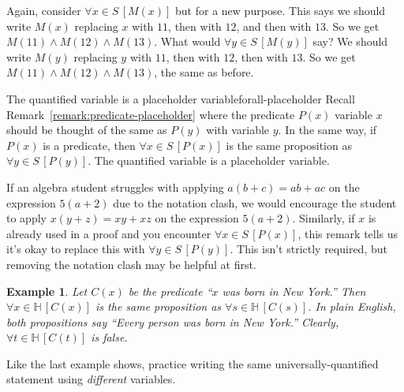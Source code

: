 \documentclass{book}
\newcounter{ekcounter}%
\theoremstyle{ekimcustom}
\newtheorem{example}[ekcounter]{Example}
\begin{document}
Again, consider $\forall x \in S\,[M(x)]$ but for a new purpose. This says we should write $M(x)$ replacing $x$ with $11$, then with $12$, and then with $13$. So we get $M(11) \wedge M(12) \wedge M(13)$. What would $\forall y \in S\,[M(y)]$ say? We should write $M(y)$ replacing $y$ with $11$, then with $12$, then with $13$. So we get $M(11) \wedge M(12) \wedge M(13)$, the same as before.
\begin{bremark}{The quantified variable is a placeholder variable}{forall-placeholder}
Recall Remark~\ref{remark:predicate-placeholder} where the predicate $P(x)$ variable $x$ should be thought of the same as $P(y)$ with variable $y$. In the same way, if $P(x)$ is a predicate, then $\forall x \in S\,[P(x)]$ is the same proposition as $\forall y \in S\,[P(y)]$. The quantified variable is a placeholder variable.
\end{bremark}
If an algebra student struggles with applying $a(b+c)=ab+ac$ on the expression $5(a+2)$ due to the notation clash, we would encourage the student to apply $x(y+z)=xy+xz$ on the expression $5(a+2)$. Similarly, if $x$ is already used in a proof and you encounter $\forall x \in S\,[P(x)]$, this remark tells us it's okay to replace this with $\forall y \in S\,[P(y)]$. This isn't strictly required, but removing the notation clash may be helpful at first.
\begin{example}
Let $C(x)$ be the predicate ``$x$ was born in New York.'' Then $\forall x \in \mathbb{H}\,[C(x)]$ is the same proposition as $\forall s \in \mathbb{H}\,[C(s)]$. In plain English, both propositions say ``Every person was born in New York.'' Clearly, $\forall t \in \mathbb{H}\,[C(t)]$ is false.
\end{example}
Like the last example shows, practice writing the same universally-quantified statement using \emph{different} variables.
\end{document}
